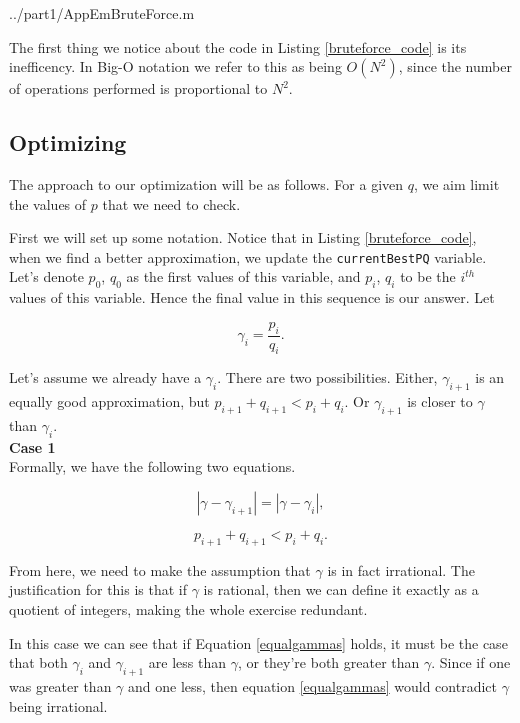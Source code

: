 \documentclass[10pt]{article}
\newcommand*{\gam}{$\gamma$}
\newcommand*{\gami}{$\gamma_{i}$}
\begin{document}
   {../part1/AppEmBruteForce.m}

The first thing we notice about the code in Listing \ref{bruteforce_code} is its inefficency. In Big-O notation we refer to this as being $O(N^2)$, since the number of operations performed is proportional to $N^2$.

\subsection{Optimizing}
The approach to our optimization will be as follows. For a given $q$, we aim limit the values of $p$ that we need to check. 

First we will set up some notation. Notice that in Listing \ref{bruteforce_code}, when we find a better approximation, we update the \texttt{currentBestPQ} variable. Let's denote $p_0$, $q_0$  as the first values of this variable, and $p_i$, $q_i$ to be the $i^{th}$ values of this variable. Hence the final value in this sequence is our answer. Let

\begin{equation} \label{defgammai}
  \gamma_i = \frac{p_i}{q_i}.
\end{equation}


Let's assume we already have a \gami.  There are two possibilities. Either, $\gamma_{i+1}$ is an equally good approximation, but  $p_{i+1} + q_{i+1} < p_i + q_i$. Or $\gamma_{i+1}$ is closer to $\gamma$ than \gami. \\

\noindent \textbf{Case 1 } \\

Formally, we have the following two equations.

\begin{equation}\label{equalgammas}
|\gamma- \gamma_{i+1}| = |\gamma - \gamma_{i}| ,
\end{equation}

\begin{equation} \label{contradiction}
p_{i+1} + q_{i+1} < p_i + q_i.
\end{equation}

From here, we need to make the assumption that $\gamma$ is in fact irrational. The justification for this is that if $\gamma$ is rational, then we can define it exactly as a quotient of integers, making the whole exercise redundant. 

In this case we can see that if Equation \ref{equalgammas} holds, it must be the case that both $\gamma_{i}$ and $\gamma_{i+1}$ are less than \gam, or they're both greater than $\gamma$. Since if one was greater than $\gamma$ and one less, then equation  \ref{equalgammas} would contradict $\gamma$ being irrational.
\end{document}

